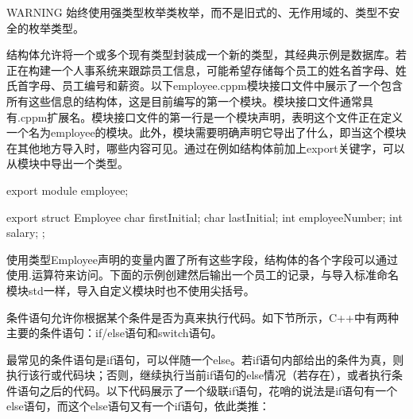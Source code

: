 \begin{myWarning}{WARNING}
始终使用强类型枚举类枚举，而不是旧式的、无作用域的、类型不安全的枚举类型。
\end{myWarning}


结构体允许将一个或多个现有类型封装成一个新的类型，其经典示例是数据库。若正在构建一个人事系统来跟踪员工信息，可能希望存储每个员工的姓名首字母、姓氏首字母、员工编号和薪资。以下employee.cppm模块接口文件中展示了一个包含所有这些信息的结构体，这是目前编写的第一个模块。模块接口文件通常具有.cppm扩展名。模块接口文件的第一行是一个模块声明，表明这个文件正在定义一个名为employee的模块。此外，模块需要明确声明它导出了什么，即当这个模块在其他地方导入时，哪些内容可见。通过在例如结构体前加上export关键字，可以从模块中导出一个类型。

\begin{cpp}
export module employee;

export struct Employee {
    char firstInitial;
    char lastInitial;
    int employeeNumber;
    int salary;
};
\end{cpp}

使用类型Employee声明的变量内置了所有这些字段，结构体的各个字段可以通过使用.运算符来访问。下面的示例创建然后输出一个员工的记录，与导入标准命名模块std一样，导入自定义模块时也不使用尖括号。



条件语句允许你根据某个条件是否为真来执行代码。如下节所示，C++中有两种主要的条件语句：if/else语句和switch语句。


最常见的条件语句是if语句，可以伴随一个else。若if语句内部给出的条件为真，则执行该行或代码块；否则，继续执行当前if语句的else情况（若存在），或者执行条件语句之后的代码。以下代码展示了一个级联if语句，花哨的说法是if语句有一个else语句，而这个else语句又有一个if语句，依此类推：

